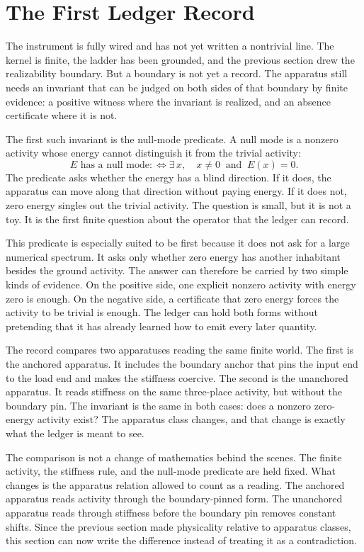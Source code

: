 \section{The First Ledger Record}

The instrument is fully wired and has not yet written a nontrivial line. The
kernel is finite, the ladder has been grounded, and the previous section drew the
realizability boundary. But a boundary is not yet a record. The apparatus still
needs an invariant that can be judged on both sides of that boundary by finite
evidence: a positive witness where the invariant is realized, and an absence
certificate where it is not.

The first such invariant is the null-mode predicate. A null mode is a nonzero
activity whose energy cannot distinguish it from the trivial activity:
\[
  E \text{ has a null mode}
  :\Longleftrightarrow
  \exists\, x,\quad x \neq 0 \ \text{ and }\ E(x) = 0.
\]
The predicate asks whether the energy has a blind direction. If it does, the
apparatus can move along that direction without paying energy. If it does not,
zero energy singles out the trivial activity. The question is small, but it is
not a toy. It is the first finite question about the operator that the ledger can
record.

This predicate is especially suited to be first because it does not ask for a
large numerical spectrum. It asks only whether zero energy has another
inhabitant besides the ground activity. The answer can therefore be carried by
two simple kinds of evidence. On the positive side, one explicit nonzero
activity with energy zero is enough. On the negative side, a certificate that zero
energy forces the activity to be trivial is enough. The ledger can hold both
forms without pretending that it has already learned how to emit every later
quantity.

The record compares two apparatuses reading the same finite world. The first is
the anchored apparatus. It includes the boundary anchor that pins the input end
to the load end and makes the stiffness coercive. The second is the
unanchored apparatus. It reads stiffness on the same three-place activity, but
without the boundary pin. The invariant is the same in both cases: does a
nonzero zero-energy activity exist? The apparatus class changes, and that change
is exactly what the ledger is meant to see.

The comparison is not a change of mathematics behind the scenes. The finite
activity, the stiffness rule, and the null-mode predicate are held fixed. What
changes is the apparatus relation allowed to count as a reading. The anchored
apparatus reads activity through the boundary-pinned form. The unanchored
apparatus reads through stiffness before the boundary pin removes constant
shifts. Since the previous section made physicality relative to apparatus
classes, this section can now write the difference instead of treating it as a
contradiction.

